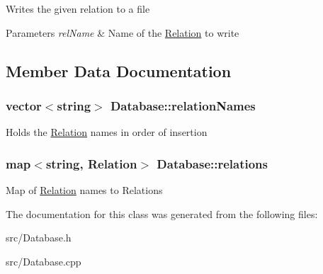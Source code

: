 Writes the given relation to a file 
\begin{DoxyParams}{Parameters}
{\em rel\-Name} & Name of the \hyperlink{class_relation}{Relation} to write \\
\hline
\end{DoxyParams}


\subsection{Member Data Documentation}
\hypertarget{class_database_ae33e101d9096adf93aeee9c95b7e41d2}{
\subsubsection[{relation\-Names}]{\setlength{\rightskip}{0pt plus 5cm}vector$<$string$>$ Database\-::relation\-Names\hspace{0.3cm}{\ttfamily [private]}}}\label{class_database_ae33e101d9096adf93aeee9c95b7e41d2}
Holds the \hyperlink{class_relation}{Relation} names in order of insertion \hypertarget{class_database_a170fceaed7e90333c306c8003320efc5}{
\subsubsection[{relations}]{\setlength{\rightskip}{0pt plus 5cm}map$<$string, {\bf Relation}$>$ Database\-::relations\hspace{0.3cm}{\ttfamily [private]}}}\label{class_database_a170fceaed7e90333c306c8003320efc5}
Map of \hyperlink{class_relation}{Relation} names to Relations 

The documentation for this class was generated from the following files\-:\begin{DoxyCompactItemize}
\item 
src/Database.\-h\item 
src/Database.\-cpp\end{DoxyCompactItemize}

